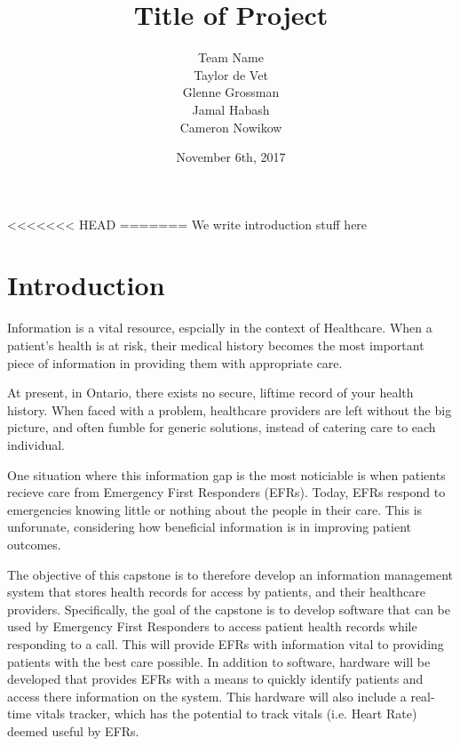 \documentclass{article}
\title{Title of Project}
\author{Team Name
		\\ Taylor de Vet
    \\ Glenne Grossman
		\\ Jamal Habash
		\\ Cameron Nowikow
}
\date{November 6th, 2017}
\begin{document}
\newpage

\maketitle

<<<<<<< HEAD
\newpage
=======
We write introduction stuff here

\section{Introduction}

Information is a vital resource, espcially in the context of Healthcare. When a patient's health is at risk, their medical history becomes the most important piece of information in providing them with appropriate care.

At present, in Ontario, there exists no secure, liftime record of your health history. When faced with a problem, healthcare providers are left without the big picture, and often fumble for generic solutions, instead of catering care to each individual.

One situation where this information gap is the most noticiable is when patients recieve care from Emergency First Responders (EFRs). Today, EFRs respond to emergencies knowing little or nothing about the people in their care. This is unforunate, considering how beneficial information is in improving patient outcomes. \iffalse For example, nursing homes often carry documents that contain health information on their residents. This information, including medications, allergies and diagonsed disorders gives EFRs an important base-knowledge for how assessing a patient. \fi

The objective of this capstone is to therefore develop an information management system that stores health records for access by patients, and their healthcare providers. Specifically, the goal of the capstone is to develop software that can be used by Emergency First Responders to access patient health records while responding to a call. This will provide EFRs with information vital to providing patients with the best care possible. In addition to software, hardware will be developed that provides EFRs with a means to quickly identify patients and access there information on the system. This hardware will also include a real-time vitals tracker, which has the potential to track vitals (i.e. Heart Rate) deemed useful by EFRs.
\end{document}
